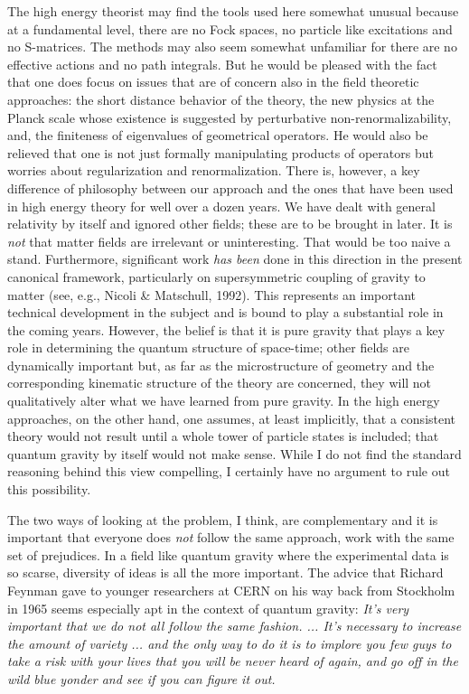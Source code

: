 The high energy theorist may find the tools used here somewhat unusual
because at a fundamental level, there are no Fock spaces, no particle like
excitations and no
S-matrices. The methods may also seem somewhat unfamiliar for there are
no effective actions and no path integrals. But he would be pleased with
the fact that one does focus on issues that are of concern also in the field
theoretic approaches: the short distance behavior of the theory, the new
physics at the Planck scale whose existence is suggested by perturbative
non-renormalizability, and, the finiteness of eigenvalues of geometrical
operators. He would also be relieved that one is not just formally
manipulating products of operators but worries about regularization and
renormalization. There is, however, a key difference of philosophy between
our approach and the ones that have been used in high energy theory for well
over a dozen years. We have dealt with general relativity by itself and
ignored other fields; these are to be brought in later. It is {\it not} that
matter fields are irrelevant or uninteresting. That would be too naive a stand.
Furthermore, significant work {\it has been} done in this direction in the
present canonical framework, particularly on supersymmetric coupling of
gravity to matter (see, e.g., Nicoli \& Matschull, 1992). This represents an
important technical development in the subject and is bound to play a
substantial role in the coming years. However, the belief is that it is pure
gravity that plays a key role in determining the quantum structure of
space-time; other fields are dynamically important but, as far as the
microstructure of geometry and the corresponding kinematic structure of the
theory are concerned, they will not qualitatively alter what we have
learned from pure gravity. In the high energy approaches, on the other hand,
one assumes, at least implicitly, that a consistent theory would not result
until a whole tower of particle states is included; that quantum gravity by
itself would not make sense. While I do not find the standard reasoning
behind this view compelling, I certainly have no argument to rule out this
possibility.

The two ways of looking at the problem, I think, are complementary and it
is important that everyone does {\it not} follow the same approach, work
with the same set of prejudices. In a field like quantum gravity where the
experimental data is so scarse, diversity of ideas is all the more important.
The advice that Richard Feynman gave to younger researchers at CERN on his way
back from Stockholm in 1965 seems especially apt in the context of quantum
gravity:
\smallskip
{\narrower\narrower\smallskip\noindent
{\sl It's very important that we do not all follow the same fashion.
 ... It's necessary to increase the amount of variety ... and the only way to
do it is to implore you few guys to take a risk with your lives that you will
be never heard of again, and go off in the wild blue yonder and see if you
can figure it out.}\smallskip}
\bigskip

